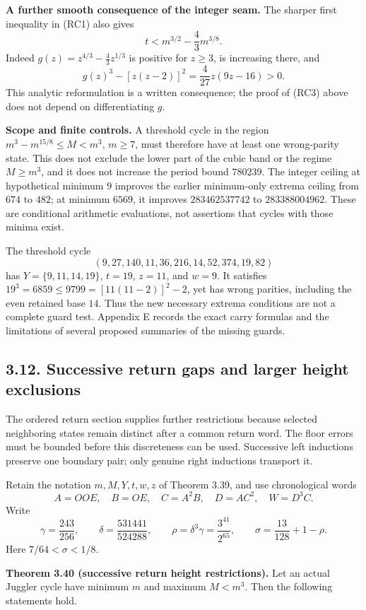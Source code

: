 \documentclass[12pt]{article}
\begin{document}
\textbf{A further smooth consequence of the integer seam.} The sharper
first inequality in (RC1) also gives \[
t<m^{3/2}-\frac43m^{3/8}.
\] Indeed \(g(z)=z^{4/3}-\frac43z^{1/3}\) is positive for \(z\ge3\), is
increasing there, and \[
g(z)^3-[z(z-2)]^2=\frac4{27}z(9z-16)>0.
\] This analytic reformulation is a written consequence; the proof of
(RC3) above does not depend on differentiating \(g\).

\textbf{Scope and finite controls.} A threshold cycle in the region
\(m^3-m^{15/8}\le M<m^3\), \(m\ge7\), must therefore have at least one
wrong-parity state. This does not exclude the lower part of the cubic
band or the regime \(M\ge m^3\), and it does not increase the period
bound \(780239\). The integer ceiling at hypothetical minimum \(9\)
improves the earlier minimum-only extrema ceiling from \(674\) to
\(482\); at minimum \(6569\), it improves \(283462537742\) to
\(283388004962\). These are conditional arithmetic evaluations, not
assertions that cycles with those minima exist.

The threshold cycle \[
(9,27,140,11,36,216,14,52,374,19,82)
\] has \(Y=\{9,11,14,19\}\), \(t=19\), \(z=11\), and \(w=9\). It
satisfies \(19^3=6859\le9799=[11(11-2)]^2-2\), yet has wrong parities,
including the even retained base \(14\). Thus the new necessary extrema
conditions are not a complete guard test. Appendix E records the exact
carry formulas and the limitations of several proposed summaries of the
missing guards.

\subsection{3.12. Successive return gaps and larger height
exclusions}\label{successive-return-gaps-and-larger-height-exclusions}

The ordered return section supplies further restrictions because
selected neighboring states remain distinct after a common return word.
The floor errors must be bounded before this discreteness can be used.
Successive left inductions preserve one boundary pair; only genuine
right inductions transport it.

Retain the notation \(m,M,Y,t,w,z\) of Theorem 3.39, and use
chronological words \[
A=OOE,\quad B=OE,\quad C=A^2B,\quad D=AC^2,\quad W=D^3C.
\] Write \[
\gamma=\frac{243}{256},\qquad
\delta=\frac{531441}{524288},\qquad
\rho=\delta^3\gamma=\frac{3^{41}}{2^{65}},
\qquad \sigma=\frac{13}{128}+1-\rho.
\] Here \(7/64<\sigma<1/8\).

\textbf{Theorem 3.40 (successive return height restrictions).} Let an
actual Juggler cycle have minimum \(m\) and maximum \(M<m^3\). Then the
following statements hold.
\end{document}
